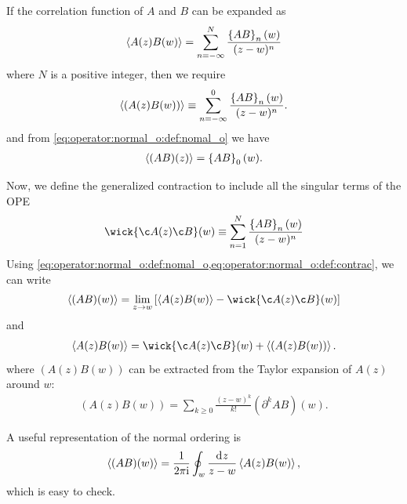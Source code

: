 \documentclass[10pt]{article}
\newcommand{\ii}{\mathrm{i}}
\begin{document}
If the correlation function of $A$ and $B$ can be expanded as
\begin{align}
    \expval{A(z)B(w)}=\sum_{n=-\infty}^{N}\frac{\left\{AB\right\}_n(w)}{(z-w)^n}\label{eq:operator:normal_o:ABOPE}
\end{align}
where $N$ is a positive integer, then we require
\begin{align}
    \expval{(A(z)B(w))}\equiv\sum_{n=-\infty}^{0}\frac{\left\{AB\right\}_n(w)}{(z-w)^n}.\label{eq:operator:normal_o:def:nomal_o}
\end{align}
and from \cref{eq:operator:normal_o:def:nomal_o} we have
\begin{align}
    \expval{(AB)(z)}=\left\{AB\right\}_0(w).
\end{align}

Now, we define the generalized contraction to include all the singular terms of the OPE
\begin{align}
    \wick{\c A(z) \c B}(w)\equiv\sum_{n=1}^N\frac{\left\{AB\right\}_n(w)}{(z-w)^n}\label{eq:operator:normal_o:def:contrac}
\end{align}
Using \cref{eq:operator:normal_o:def:nomal_o,eq:operator:normal_o:def:contrac}, we can write
\begin{align}
    \expval{(AB)(w)}=\lim_{z\to w}\left[\expval{A(z)B(w)}-\wick{\c A(z) \c B}(w)\right]
\end{align}
and
\begin{align}
    \expval{A(z)B(w)}=\wick{\c A(z) \c B}(w)+\expval{\left(A(z)B(w)\right)}.
\end{align}
where $(A(z)B(w))$ can be extracted from the Taylor expansion of $A(z)$ around $w$:
\begin{align}
    (A(z)B(w))=\sum_{k\geq0}\frac{(z-w)^k}{k!}\left(\partial^k AB\right)(w).\label{eq:operator:normal_o:regular_A_B}
\end{align}
\begin{claim}
    A useful representation of the normal ordering is
    \begin{align}
        \expval{(AB)(w)}=\frac{1}{2\pi\ii}\oint_w\frac{\dd[]{z}}{z-w}\expval{A(z)B(w)},\label{eq:operator:normal_o:alternative_norm_O}
    \end{align}
    which is easy to check.
\end{claim}
\end{document}
